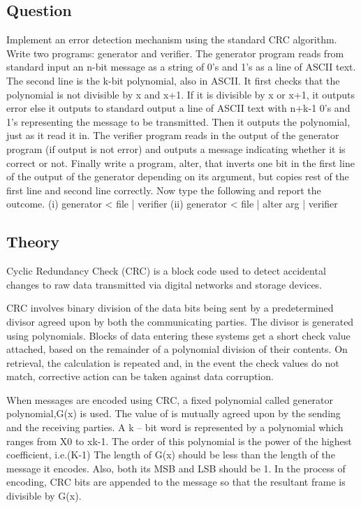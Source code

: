 \documentclass[11pt,a4paper]{article}
\begin{document}
\subsection{Question}\label{sec:question3}
Implement an error detection mechanism using the standard CRC algorithm. Write two programs: generator and verifier. The generator program reads from standard input an n-bit message as a string of 0’s and 1’s as a line of ASCII text. The second line is the k-bit polynomial, also in ASCII. It first checks that the polynomial is not divisible by x and x+1. If it is divisible by x or x+1, it outputs error else it outputs to standard output a line of ASCII text with n+k-1 0’s and 1’s representing the message to be transmitted. Then it outputs the polynomial, just as it read it in. The verifier program reads in the output of the generator program (if output is not error) and outputs a message indicating whether it is correct or not. Finally write a program, alter, that inverts one bit in the first line of the output of the generator depending on its argument, but copies rest of the first line and second line correctly. Now type the following and report the outcome.
(i) generator < file | verifier
(ii) generator < file | alter arg | verifier

\subsection{Theory}\label{sec:theory3}
Cyclic Redundancy Check (CRC) is a block code used to detect accidental changes to raw data transmitted via digital networks and storage devices.

CRC involves binary division of the data bits being sent by a predetermined divisor agreed upon by both the communicating parties. The divisor is generated using polynomials.
Blocks of data entering these systems get a short check value attached, based on the remainder of a polynomial division of their contents. On retrieval, the calculation is repeated and, in the event the check values do not match, corrective action can be taken against data corruption.

When messages are encoded using CRC, a fixed polynomial called generator polynomial,G(x) is used. The value of is mutually agreed upon by the sending and the receiving parties. A k – bit word is represented by a polynomial which ranges from X0 to xk-1. The order of this polynomial is the power of the highest coefficient, i.e.(K-1) The length of G(x) should be less than the length of the message it encodes. Also, both its MSB and LSB should be 1. In the process of encoding, CRC bits are appended to the message so that the resultant frame is divisible by G(x).
\end{document}
